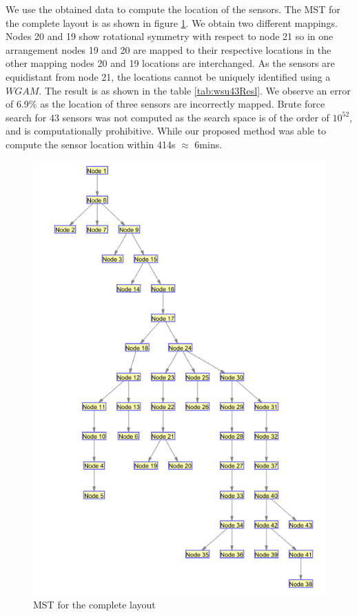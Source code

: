 We use the obtained data to compute the location of the sensors. The MST for the complete layout is as shown in figure \ref{fig:MST43}. We obtain two different mappings. 
Nodes 20 and 19 show rotational symmetry with respect to node 21 so in one arrangement nodes 19 and 20 are mapped to their respective locations in the other mapping nodes 20 and 19 locations are interchanged. As the sensors are equidistant from node 21, the locations cannot be uniquely identified using a $WGAM$. 
The result is as shown in the table \ref{tab:wsu43Resl}. We observe an error of 6.9\% as the location of three sensors are incorrectly mapped.
Brute force search for 43 sensors was not computed as the search space is of the order of $10^{52}$, and is computationally prohibitive.
While our proposed method was able to compute the sensor location within 414s $\approx$ 6mins. 
  
  

\begin{figure}
\centering
\includegraphics[width=\textwidth]{./pics/43_sensors.png}
\caption{MST for the complete layout}
\label{fig:MST43}
\end{figure}
 
